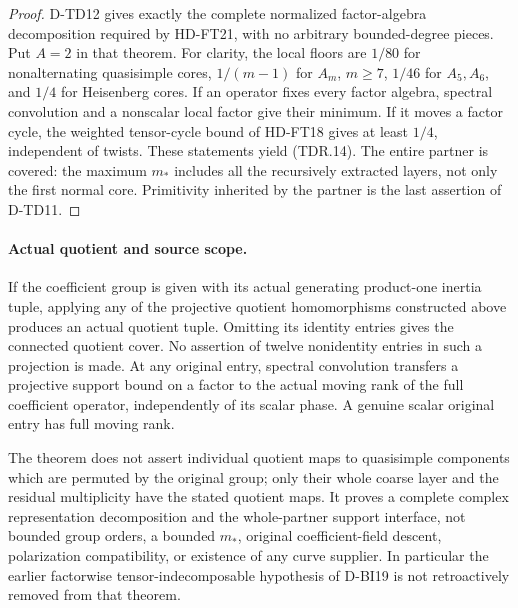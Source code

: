 \begin{proof}
D-TD12 gives exactly the complete normalized factor-algebra
decomposition required by HD-FT21, with no arbitrary bounded-degree
pieces.  Put $A=2$ in that theorem.  For clarity, the local floors
are $1/80$ for nonalternating quasisimple cores, $1/(m-1)$ for
$A_m$, $m\ge7$, $1/46$ for $A_5,A_6$, and $1/4$ for
Heisenberg cores.  If an operator fixes every factor algebra,
spectral convolution and a nonscalar local factor give their
minimum.  If it moves a factor cycle, the weighted tensor-cycle
bound of HD-FT18 gives at least $1/4$, independent of twists.
These statements yield (TDR.14).  The entire partner is covered:
the maximum $m_*$ includes all the recursively extracted layers,
not only the first normal core.  Primitivity inherited by the
partner is the last assertion of D-TD11.
\end{proof}

\paragraph{Actual quotient and source scope.}
If the coefficient group is given with its actual generating
product-one inertia tuple, applying any of the projective quotient
homomorphisms constructed above produces an actual quotient tuple.
Omitting its identity entries gives the connected quotient cover.
No assertion of twelve nonidentity entries in such a projection is
made.  At any original entry, spectral convolution transfers a
projective support bound on a factor to the actual moving rank of
the full coefficient operator, independently of its scalar phase.
A genuine scalar original entry has full moving rank.

The theorem does not assert individual quotient maps to quasisimple
components which are permuted by the original group; only their
whole coarse layer and the residual multiplicity have the stated
quotient maps.  It proves a complete complex representation
decomposition and the whole-partner support interface, not bounded
group orders, a bounded $m_*$, original coefficient-field descent,
polarization compatibility, or existence of any curve supplier.
In particular the earlier factorwise tensor-indecomposable
hypothesis of D-BI19 is not retroactively removed from that theorem.
